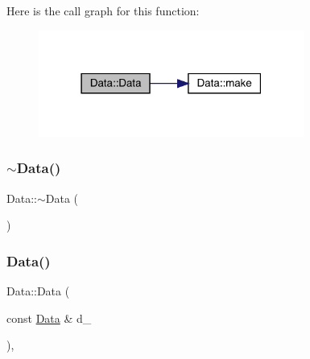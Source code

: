 Here is the call graph for this function\+:
\nopagebreak
\begin{figure}[H]
\begin{center}
\leavevmode
\includegraphics[width=247pt]{d0/df3/classData_a9f1ea96cc98b80ed3778ff5818cb91f8_cgraph}
\end{center}
\end{figure}
\mbox{\label{classData_aab31956423290f0d62dcca47ab4d16dd}} 
\subsubsection{\texorpdfstring{$\sim$Data()}{~Data()}\hspace{0.1cm}{\footnotesize\ttfamily [1/2]}}
{\footnotesize\ttfamily Data\+::$\sim$\+Data (\begin{DoxyParamCaption}{ }\end{DoxyParamCaption})\hspace{0.3cm}{\ttfamily [inline]}}

\mbox{\label{classData_a860bcc89b14c2106e0fc5e33f065fa0f}} 
\subsubsection{\texorpdfstring{Data()}{Data()}\hspace{0.1cm}{\footnotesize\ttfamily [3/6]}}
{\footnotesize\ttfamily Data\+::\+Data (\begin{DoxyParamCaption}\item[{const \mbox{\hyperlink{classData}{Data}} \&}]{d\+\_\+ }\end{DoxyParamCaption})\hspace{0.3cm}{\ttfamily [inline]}, {\ttfamily [protected]}}

\mbox{\label{classData_af11f741cb7f587e2e495452a8905a22a}} 
